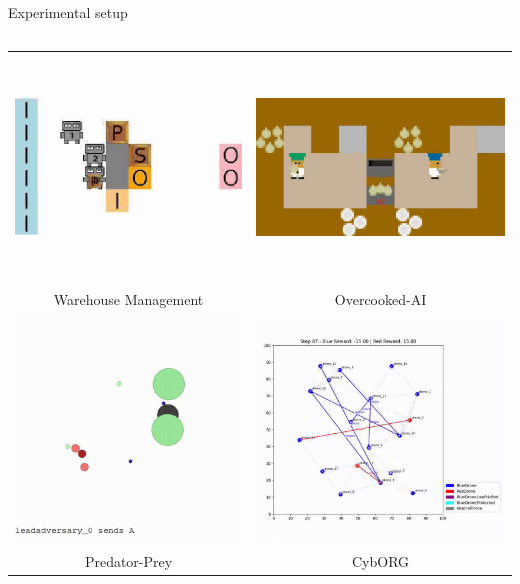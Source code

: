 \documentclass[9pt, aspectratio=169]{beamer}
\begin{document}
\begin{frame}{Experimental setup}
\begin{columns}[c]
    \begin{column}{0.5\textwidth}
      \begin{tabular}{cc}
        \includegraphics[height=0.35\linewidth]{figures/wm.png}  &
        \includegraphics[height=0.35\linewidth]{figures/overcooked.png}              \\
        \small{Warehouse Management} & \small{Overcooked-AI} \\
        \includegraphics[height=0.5\linewidth]{figures/mpe.png} &
        \includegraphics[height=0.5\linewidth]{figures/cyborg.png}                  \\
        \small{Predator-Prey} & \small{CybORG} \\
      \end{tabular}
    \end{column}
  \end{columns}

\end{frame}
\end{document}
